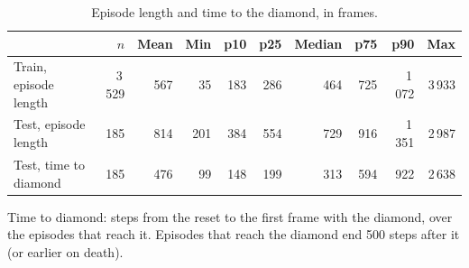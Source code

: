 \begin{table}[H]
\centering
\caption{Episode length and time to the diamond, in frames.}
\label{tab:data-length}
\small
\setlength{\tabcolsep}{3.5pt}
\begin{tabular}{lrrrrrrrrr}
\toprule
& $n$ & Mean & Min & p10 & p25 & Median & p75 & p90 & Max \\
\midrule
Train, episode length & 3\,529 & 567 & 35 & 183 & 286 & 464 & 725 & 1\,072 & 3\,933 \\
Test, episode length & 185 & 814 & 201 & 384 & 554 & 729 & 916 & 1\,351 & 2\,987 \\
\midrule
Test, time to diamond & 185 & 476 & 99 & 148 & 199 & 313 & 594 & 922 & 2\,638 \\
\bottomrule
\end{tabular}

\vspace{4pt}
\begin{minipage}{\linewidth}
\footnotesize\raggedright Time to diamond: steps from the reset to the first frame with the diamond, over the episodes that reach it. Episodes that reach the diamond end 500 steps after it (or earlier on death).
\end{minipage}
\end{table}
